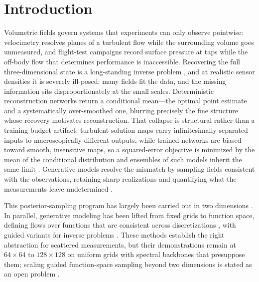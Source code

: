 \documentclass{article} %
\begin{document}
\section{Introduction}
\label{sec:intro}

Volumetric fields govern systems that experiments can only observe pointwise: velocimetry resolves planes of a turbulent flow while the surrounding volume goes unmeasured, and flight-test campaigns record surface pressure at taps while the off-body flow that determines performance is inaccessible. Recovering the full three-dimensional state is a long-standing inverse problem \citep{callaham2019robust,raissi2020hidden,vinuesa2023transformative}, and at realistic sensor densities it is severely ill-posed: many fields fit the data, and the missing information sits disproportionately at the small scales. Deterministic reconstruction networks \citep{fukami2021global,santos2023senseiver,dang2025flronet} return a conditional mean---the optimal point estimate and a systematically over-smoothed one, blurring precisely the fine structure whose recovery motivates reconstruction. That collapse is structural rather than a training-budget artifact: turbulent solution maps carry infinitesimally separated inputs to macroscopically different outputs, while trained networks are biased toward smooth, insensitive maps, so a squared-error objective is minimized by the mean of the conditional distribution and ensembles of such models inherit the same limit \citep{raonic2026gencfd}. Generative models resolve the mismatch by sampling fields consistent with the observations, retaining sharp realizations and quantifying what the measurements leave undetermined \citep{shu2023physics,li2024s3gm,zhuang2025spatially}.

This posterior-sampling program has largely been carried out in two dimensions \citep{shu2023physics,amoros2026guiding,li2024s3gm,huang2024diffusionpde,zhuang2025spatially}. In parallel, generative modeling has been lifted from fixed grids to function space, defining flows over functions that are consistent across discretizations \citep{kerrigan2024functional,lim2025score,pidstrigach2024infinite,shi2025stochastic}, with guided variants for inverse problems \citep{yao2025fundps,kerrigan2024dynamic}. These methods establish the right abstraction for scattered measurements, but their demonstrations remain at $64\times64$ to $128\times128$ on uniform grids with spectral backbones that presuppose them; scaling guided function-space sampling beyond two dimensions is stated as an open problem \citep{yao2025fundps}.
\end{document}
